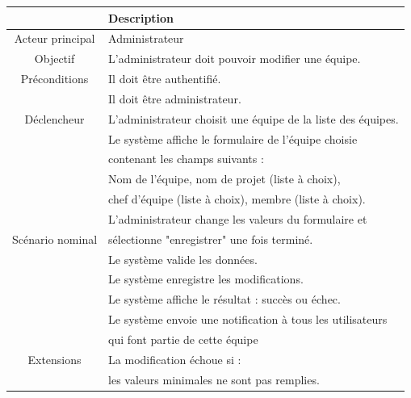 \begin{center}
\begin{tabular}{|c|l|}
\hline 
&\textbf { Description }\\\hline 
    Acteur principal & Administrateur \\\hline 
    Objectif&L’administrateur doit pouvoir modifier une équipe.\\\hline
    Préconditions&Il doit être authentifié.  \\&Il doit être administrateur.\\\hline 
    Déclencheur&L’administrateur choisit une équipe de la liste des équipes.\\\hline 
    &Le système affiche le formulaire de l'équipe choisie   \\&contenant les champs suivants :   \\
    &Nom de l’équipe, nom de projet (liste à choix),  \\
    &chef d’équipe (liste à choix), membre (liste à choix).\\
    &L’administrateur change les valeurs du formulaire et  \\
    Scénario nominal& sélectionne "enregistrer" une fois terminé.\\
    &Le système valide les données. \\
    &Le système enregistre les modifications.   \\
    &Le système affiche le résultat : succès ou échec. \\
    &Le système envoie une notification à tous les utilisateurs\\
    &qui font partie de cette équipe\\\hline
    Extensions&La modification échoue si :  \\
    &les valeurs minimales ne sont pas remplies. \\\hline
\end{tabular}
\label{desc_modif_eq}
\end{center}\newpage
